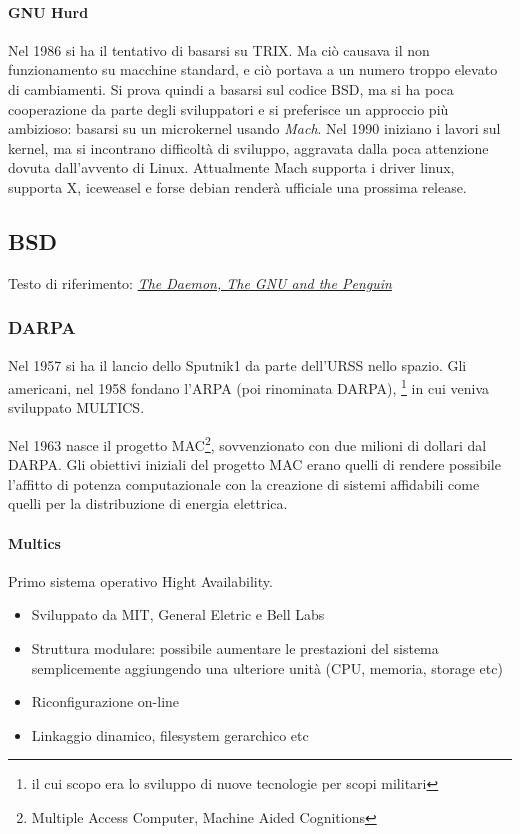 \paragraph*{GNU Hurd} Nel 1986 si ha il tentativo di basarsi su TRIX. Ma ci\`o causava il non funzionamento su macchine standard, e ci\`o portava a un numero troppo elevato di cambiamenti. Si prova quindi a basarsi sul codice BSD, ma si ha poca cooperazione da parte degli sviluppatori e si preferisce un approccio pi\`u ambizioso: basarsi su un microkernel usando \textit{Mach}. Nel 1990 iniziano i lavori sul kernel, ma si incontrano difficolt\`a di sviluppo, aggravata dalla poca attenzione dovuta dall'avvento di Linux. Attualmente Mach supporta i driver linux, supporta X, iceweasel e forse debian render\`a ufficiale una prossima release.

\subsection{BSD}

Testo di riferimento: \href{http://www.groklaw.net/staticpages/index.php?page=20051013231901859}{\textit{The Daemon, The GNU and the Penguin}}

\subsubsection{DARPA}

Nel 1957 si ha il lancio dello Sputnik1 da parte dell'URSS nello spazio. Gli americani, nel 1958 fondano l'ARPA (poi rinominata DARPA), \footnote{il cui scopo era lo sviluppo di nuove tecnologie per scopi militari} in cui veniva sviluppato MULTICS.

Nel 1963 nasce il progetto MAC\footnote{Multiple Access Computer, Machine Aided Cognitions}, sovvenzionato con due milioni di dollari dal DARPA. Gli obiettivi iniziali del progetto MAC erano quelli di rendere possibile l'affitto di potenza computazionale con la creazione di sistemi affidabili come quelli per la distribuzione di energia elettrica.

\paragraph*{Multics} Primo sistema operativo Hight Availability. \begin{itemize}

\item Sviluppato da MIT, General Eletric e Bell Labs
\item Struttura modulare: possibile aumentare le prestazioni del sistema semplicemente aggiungendo una ulteriore unit\`a (CPU, memoria, storage etc)
\item Riconfigurazione on-line
\item Linkaggio dinamico, filesystem gerarchico etc

\end{itemize}

